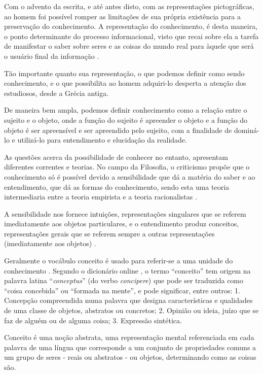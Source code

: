 Com o advento da escrita, e até antes disto, com as representações pictográficas, ao homem foi possível romper as limitações de sua própria existência para a preservação do conhecimento. A representação do conhecimento, é desta maneira, o ponto determinante do processo informacional, visto que recai sobre ela a tarefa de manifestar o saber sobre seres e as coisas do mundo real para àquele que será o usuário final da informação \cite{caixeta:2008.representacao}.

Tão importante quanto sua representação, o que podemos definir como sendo conhecimento, e o que possibilita ao homem adquiri-lo desperta a atenção dos estudiosos, desde a Grécia antiga.

De maneira bem ampla, podemos definir conhecimento como a relação entre o sujeito e o objeto, onde a função do sujeito é apreender o objeto e a função do objeto é ser apreensível e ser apreendido pelo sujeito, com a finalidade de dominá-lo e utilizá-lo para entendimento e elucidação da realidade.

As questões acerca da possibilidade de conhecer no entanto, apresentam diferentes correntes e teorias. No campo da Filosofia, o criticismo propõe que o conhecimento só é possível devido a sensibilidade que dá a matéria do saber e ao entendimento, que dá as formas do conhecimento, sendo esta uma teoria intermediaria entre a teoria empirista e a teoria racionalistas \cite{kant:1983.critica}.

A sensibilidade nos fornece intuições, representações singulares que se referem imediatamente aos objetos particulares, e o entendimento produz conceitos, representações  gerais que se referem sempre  a  outras  representações  (imediatamente  aos  objetos) \cite{pereira:2011.espaco}.

Geralmente o vocábulo conceito é usado para referir-se a uma unidade do conhecimento \cite{lima:2007.categorizacao}. Segundo o dicionário online , o termo “conceito” tem origem na palavra latina “\textit{conceptus}” (do verbo \textit{concipere}) que pode ser traduzida como “coisa concebida” ou “formada na mente”, e pode significar, entre outros: 1. Concepção compreendida numa palavra que designa características e qualidades de uma classe de objetos, abstratos ou concretos; 2. Opinião ou ideia, juízo que se faz de alguém ou de alguma coisa; 3. Expressão sintética.

Conceito é uma noção abstrata, uma representação mental referenciada em cada palavra de uma língua que corresponde a um conjunto de propriedades comuns a um grupo de seres - reais ou abstratos - ou objetos, determinando como as coisas são. 

